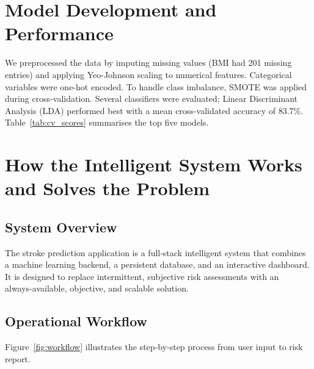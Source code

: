 \documentclass[12pt,a4paper]{article}
\begin{document}
\section{Model Development and Performance}
We preprocessed the data by imputing missing values (BMI had 201 missing entries) and applying Yeo-Johnson scaling to numerical features. Categorical variables were one-hot encoded. To handle class imbalance, SMOTE was applied during cross-validation. Several classifiers were evaluated; Linear Discriminant Analysis (LDA) performed best with a mean cross-validated accuracy of 83.7\%. Table~\ref{tab:cv_scores} summarises the top five models.

\section{How the Intelligent System Works and Solves the Problem}

\subsection{System Overview}
The stroke prediction application is a full‑stack intelligent system that combines a machine learning backend, a persistent database, and an interactive dashboard. It is designed to replace intermittent, subjective risk assessments with an always‑available, objective, and scalable solution.

\subsection{Operational Workflow}
Figure~\ref{fig:workflow} illustrates the step‑by‑step process from user input to risk report.
\end{document}
